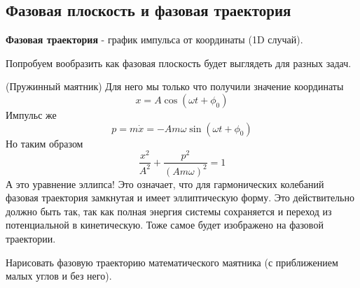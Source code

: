 \subsection{Фазовая плоскость и фазовая траектория}
\begin{definition}
    \textbf{Фазовая траектория} - график импульса от координаты (1D случай).
\end{definition}
Попробуем вообразить как фазовая плоскость будет выглядеть для разных задач.
\begin{example}(Пружинный маятник)
    Для него мы только что получили значение координаты
    \begin{equation*}
        x = A \cos(\omega t + \phi_0)
    \end{equation*}
    Импульс же
    \begin{equation*}
        p = m \dot{x} = -Am\omega \sin(\omega t + \phi_0)
    \end{equation*}
    Но таким образом
    \begin{equation*}
        \frac{x^2}{A^2} + \frac{p^2}{(A m \omega)^2} = 1
    \end{equation*}
    А это уравнение эллипса! Это означает, что для гармонических колебаний фазовая траектория замкнутая и имеет эллиптическую форму. Это действительно должно быть так, так как полная энергия системы сохраняется и переход из потенциальной в кинетическую. Тоже самое будет изображено на фазовой траектории.
\end{example}

\begin{prac}
    Нарисовать фазовую траекторию математического маятника (с приближением малых углов и без него).
\end{prac}